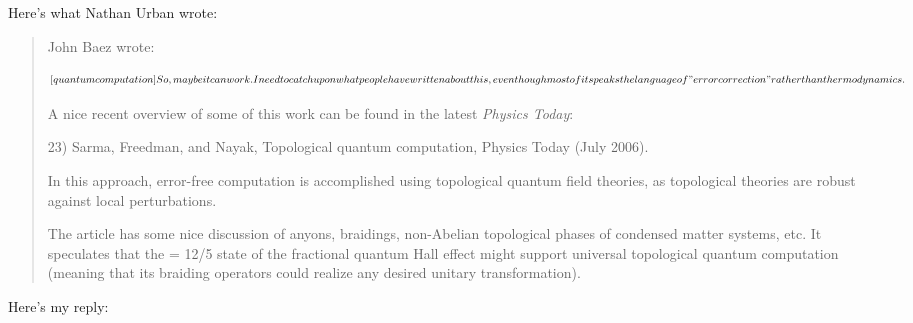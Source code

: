 Here's what Nathan Urban wrote:

\begin{quote}
John Baez wrote:


$$

 [quantum computation]
 So, maybe it can work.  I need to catch up on what people 
 have written about this, even though most of it speaks the 
 language of "error correction" rather than thermodynamics.
$$
    

A nice recent overview of some of this work can be found in the 
latest \emph{Physics Today}:

23) Sarma, Freedman, and Nayak, Topological quantum
computation, Physics Today (July 2006).

In this approach, error-free computation is accomplished using
topological quantum field theories, as topological theories are robust
against local perturbations.

The article has some nice discussion of anyons, braidings, non-Abelian
topological phases of condensed matter systems, etc.  It speculates
that the \nu  = 12/5 state of the fractional quantum Hall effect might
support universal topological quantum computation (meaning that its
braiding operators could realize any desired unitary transformation).
\end{quote}

Here's my reply:

